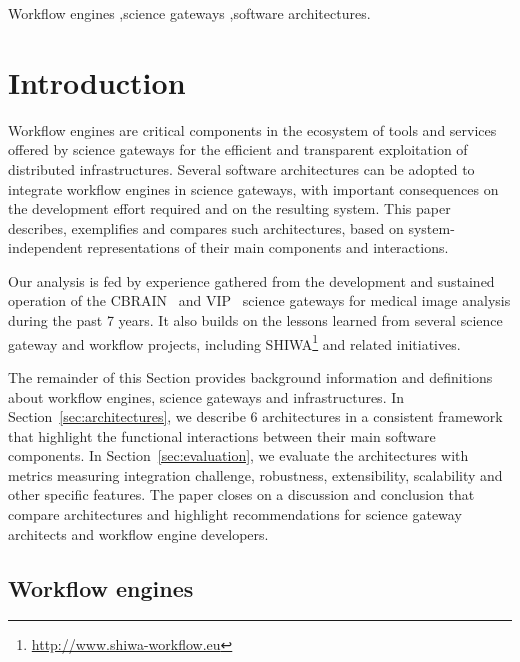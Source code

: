 \documentclass[preprint,3p,twocolumn]{elsarticle}
\begin{document}
\begin{frontmatter}
\begin{keyword}
Workflow engines \sep science gateways \sep software architectures.
\end{keyword}

\end{frontmatter}


\section{Introduction}

Workflow engines are critical components in the ecosystem of tools and
services offered by science gateways for the efficient and transparent
exploitation of distributed infrastructures. Several
software architectures can be adopted to integrate workflow engines in
science gateways, with important consequences on the 
development effort required and on the resulting system. This paper describes,
exemplifies and compares such architectures, based on
system-independent representations of their main components and
interactions.

Our analysis is fed by experience gathered from the development and
sustained operation of the CBRAIN~\cite{SHER-14} and
VIP~\cite{GLAT-13} science gateways for medical image analysis during
the past 7 years. It also builds on the lessons learned from several
science gateway and workflow projects, including
SHIWA\footnote{\url{http://www.shiwa-workflow.eu}} and related
initiatives.

The remainder of this Section provides background information and
definitions about workflow engines, science gateways and
infrastructures. In Section~\ref{sec:architectures}, we describe 6
architectures in a consistent framework that highlight the functional
interactions between their main software components. In
Section~\ref{sec:evaluation}, we evaluate the architectures with
metrics measuring integration challenge, robustness, extensibility,
scalability and other specific features. The paper closes on a
discussion and conclusion that compare architectures and highlight
recommendations for science gateway architects and workflow engine developers.

\subsection{Workflow engines}
\end{document}
